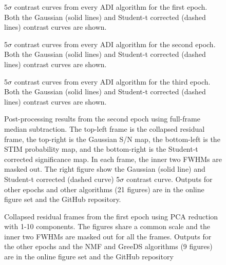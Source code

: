 
\begin{figure}[h!]
    \centering
    \caption{5$\sigma$ contrast curves from every ADI algorithm for the first epoch. Both the Gaussian (solid lines) and Student-t corrected (dashed lines) contrast curves are shown. }
\end{figure}

\begin{figure}[h!]
    \centering
    \caption{5$\sigma$ contrast curves from every ADI algorithm for the second epoch. Both the Gaussian (solid lines) and Student-t corrected (dashed lines) contrast curves are shown. }
\end{figure}

\begin{figure}[h!]
    \centering
    \caption{5$\sigma$ contrast curves from every ADI algorithm for the third epoch. Both the Gaussian (solid lines) and Student-t corrected (dashed lines) contrast curves are shown. }
\end{figure}



\begin{figure}[h!]
    \centering
    \caption{Post-processing results from the second epoch using full-frame median subtraction. The top-left frame is the collapsed residual frame, the top-right is the Gaussian S/N map, the bottom-left is the STIM probability map, and the bottom-right is the Student-t corrected significance map. In each frame, the inner two FWHMs are masked out. The right figure show the Gaussian (solid line) and Student-t corrected (dashed curve) 5$\sigma$ contrast curve. Outputs for other epochs and other algorithms (21 figures) are in the online figure set and the GitHub repository.}
\end{figure}



\begin{figure}[h!]
    \centering
    \caption{Collapsed residual frames from the first epoch using PCA reduction with 1-10 components. The figures share a common scale and the inner two FWHMs are masked out for all the frames. Outputs for the other epochs and the NMF and GreeDS algorithms (9 figures) are in the online figure set and the GitHub repository}
\end{figure}

